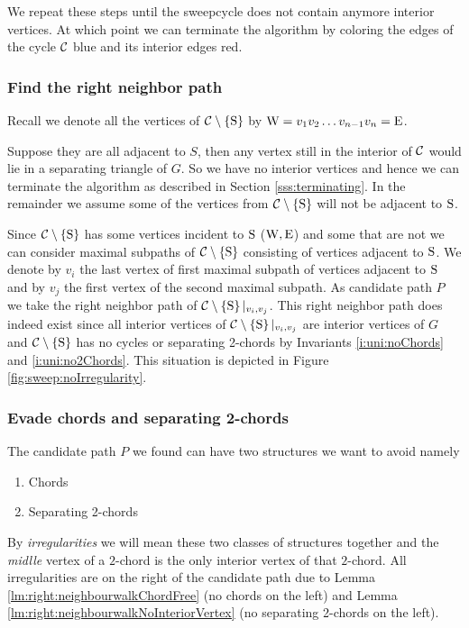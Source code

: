 We repeat these steps until the sweepcycle does not contain anymore interior vertices. At which point we can terminate the algorithm by coloring the edges of the cycle $\mathcal{C}$ blue and its interior edges red.

\subsubsection{Find the right neighbor path}
  Recall we denote all the vertices of $\mathcal{C} \setminus \left\lbrace {\mathrm{S}} \right\rbrace$ by $\mathrm{W} =  v_1   v_2   \ldots v_{n-1}   v_n = \mathrm{E}$.

  Suppose they are all adjacent to $S$, then any vertex still in the interior of $\mathcal{C}$ would lie in a separating triangle of $G$. So we have no interior vertices and hence we can terminate the algorithm as described in Section \ref{sss:terminating}.
  In the remainder we assume some of the vertices from $\mathcal{C} \setminus \left\lbrace {\mathrm{S}} \right\rbrace$ will not be adjacent to $\mathrm{S}$.

  Since $\mathcal{C} \setminus \left\lbrace {\mathrm{S}} \right\rbrace$ has some vertices incident to $\mathrm{S}$ ($\mathrm{W} , \mathrm{E}$) and some that are not we can consider maximal subpaths of $\mathcal{C} \setminus \left\lbrace {\mathrm{S}} \right\rbrace$ consisting of vertices adjacent to $\mathrm{S}$.
  We denote by $v_i$ the last vertex of first maximal subpath of vertices adjacent to $\mathrm{S}$ and by $v_j$ the first vertex of the second maximal subpath.
  As candidate path $P$ we take the right neighbor path of $\mathcal{C} \setminus \left\lbrace {\mathrm{S}} \right\rbrace|_{v_i, v_j}$. This right neighbor path does indeed exist since all interior vertices of $\mathcal{C} \setminus \left\lbrace {\mathrm{S}} \right\rbrace|_{v_i, v_j}$ are interior vertices of $G$ and $\mathcal{C} \setminus \left\lbrace {\mathrm{S}} \right\rbrace$ has no cycles or separating 2-chords by Invariants \ref{i:uni:noChords} and \ref{i:uni:no2Chords}.
  This situation is depicted in Figure \ref{fig:sweep:noIrregularity}.

\subsubsection{Evade chords and separating 2-chords}
  The candidate path $P$ we found can have two structures we want to avoid
  namely
  \begin{enumerate}
    \itemsep=-4pt
    \item Chords
    \item Separating 2-chords
  \end{enumerate}

  By \emph{irregularities} we will mean these two classes of structures together and the \emph{midlle} vertex of a $2$-chord is the only interior vertex of that $2$-chord.
  All irregularities are on the right of the candidate path due to Lemma \ref{lm:right:neighbourwalkChordFree} (no chords on the left) and Lemma \ref{lm:right:neighbourwalkNoInteriorVertex} (no separating 2-chords on the left).

